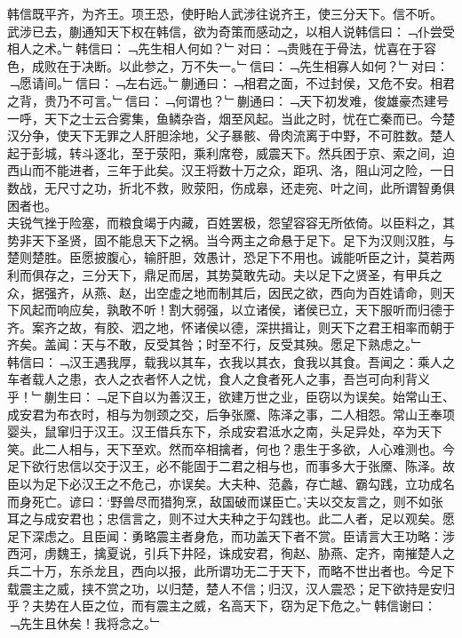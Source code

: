 韩信既平齐，为齐王。项王恐，使盱眙人武涉往说齐王，使三分天下。信不听。\\
武涉已去，蒯通知天下权在韩信，欲为奇策而感动之，以相人说韩信曰：﹁仆尝受相人之术。﹂韩信曰：﹁先生相人何如？﹂对曰：﹁贵贱在于骨法，忧喜在于容色，成败在于决断。以此参之，万不失一。﹂信曰：﹁先生相寡人如何？﹂对曰：﹁愿请间。﹂信曰：﹁左右远。﹂蒯通曰：﹁相君之面，不过封侯，又危不安。相君之背，贵乃不可言。﹂信曰：﹁何谓也？﹂蒯通曰：﹁天下初发难，俊雄豪杰建号一呼，天下之士云合雾集，鱼鳞杂沓，烟至风起。当此之时，忧在亡秦而已。今楚汉分争，使天下无罪之人肝胆涂地，父子暴骸、骨肉流离于中野，不可胜数。楚人起于彭城，转斗逐北，至于荥阳，乘利席卷，威震天下。然兵困于京、索之间，迫西山而不能进者，三年于此矣。汉王将数十万之众，距巩、洛，阻山河之险，一日数战，无尺寸之功，折北不救，败荥阳，伤成皋，还走宛、叶之间，此所谓智勇俱困者也。\\
夫锐气挫于险塞，而粮食竭于内藏，百姓罢极，怨望容容无所依倚。以臣料之，其势非天下圣贤，固不能息天下之祸。当今两主之命悬于足下。足下为汉则汉胜，与楚则楚胜。臣愿披腹心，输肝胆，效愚计，恐足下不用也。诚能听臣之计，莫若两利而俱存之，三分天下，鼎足而居，其势莫敢先动。夫以足下之贤圣，有甲兵之众，据强齐，从燕、赵，出空虚之地而制其后，因民之欲，西向为百姓请命，则天下风起而响应矣，孰敢不听！割大弱强，以立诸侯，诸侯已立，天下服听而归德于齐。案齐之故，有胶、泗之地，怀诸侯以德，深拱揖让，则天下之君王相率而朝于齐矣。盖闻：天与不敢，反受其咎；时至不行，反受其殃。愿足下熟虑之。﹂\\
韩信曰：﹁汉王遇我厚，载我以其车，衣我以其衣，食我以其食。吾闻之：乘人之车者载人之患，衣人之衣者怀人之忧，食人之食者死人之事，吾岂可向利背义乎！﹂蒯生曰：﹁足下自以为善汉王，欲建万世之业，臣窃以为误矣。始常山王、成安君为布衣时，相与为刎颈之交，后争张黡、陈泽之事，二人相怨。常山王奉项婴头，鼠窜归于汉王。汉王借兵东下，杀成安君泜水之南，头足异处，卒为天下笑。此二人相与，天下至欢。然而卒相擒者，何也？患生于多欲，人心难测也。今足下欲行忠信以交于汉王，必不能固于二君之相与也，而事多大于张黡、陈泽。故臣以为足下必汉王之不危己，亦误矣。大夫种、范蠡，存亡越、霸勾践，立功成名而身死亡。谚曰：‘野兽尽而猎狗烹，敌国破而谋臣亡。’夫以交友言之，则不如张耳之与成安君也；忠信言之，则不过大夫种之于勾践也。此二人者，足以观矣。愿足下深虑之。且臣闻：勇略震主者身危，而功盖天下者不赏。臣请言大王功略：涉西河，虏魏王，擒夏说，引兵下井陉，诛成安君，徇赵、胁燕、定齐，南摧楚人之兵二十万，东杀龙且，西向以报，此所谓功无二于天下，而略不世出者也。今足下载震主之威，挟不赏之功，以归楚，楚人不信；归汉，汉人震恐；足下欲持是安归乎？夫势在人臣之位，而有震主之威，名高天下，窃为足下危之。﹂韩信谢曰：﹁先生且休矣！我将念之。﹂\\
